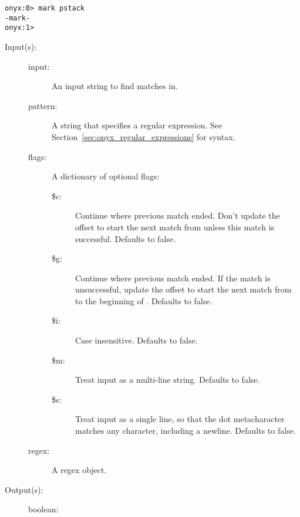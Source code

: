 \begin{description}
\begin{description}
\begin{verbatim}
onyx:0> mark pstack
-mark-
onyx:1>
		\end{verbatim}
	\end{description}
\label{systemdict:match}
\item[{\onyxop{input pattern flags}{match}{boolean}}: ]
\item[{\onyxop{input pattern}{match}{boolean}}: ]
\item[{\onyxop{input regex}{match}{boolean}}: ]
	\begin{description}\item[]
	\item[Input(s): ]
		\begin{description}\item[]
		\item[input: ]
			An input string to find matches in.
		\item[pattern: ]
			A string that specifies a regular expression.  See
			Section~\ref{sec:onyx_regular_expressions} for syntax.
		\item[flags: ]
			A dictionary of optional flags:
			\begin{description}%
			\item[\$c: ]
				Continue where previous match ended.  Don't
				update the offset to start the next match from
				unless this match is successful.  Defaults to
				false.
			\item[\$g: ]
				Continue where previous match ended.  If the
				match is unsuccessful, update the offset to
				start the next match from to the beginning of
				.  Defaults to false.
			\item[\$i: ] Case insensitive.  Defaults to false.
			\item[\$m: ] Treat input as a multi-line string.
				Defaults to false.
			\item[\$s: ] Treat input as a single line, so that
				the dot metacharacter matches any character,
				including a newline.  Defaults to false.
			\end{description}
		\item[regex: ]
			A regex object.
		\end{description}
	\item[Output(s): ]
		\begin{description}\item[]
		\item[boolean: ]
			\begin{description}\item[]

\end{description}
\end{description}
\end{description}
\end{description}

